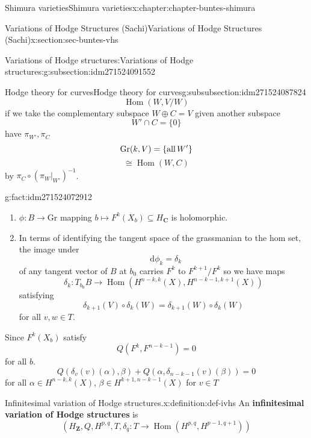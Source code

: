 \documentclass[oneside,10pt,]{book}
\newcommand{\terminology}[1]{\textbf{#1}}
\numberwithin{equation}{section}
\newcommand{\diff}{\mathop{}\!\mathrm{d}}
\newcommand{\inv}{^{-1}}
\newcommand{\ZZ}{\mathbf{Z}}
\newcommand{\CC}{\mathbf{C}}
\DeclareMathOperator{\Hom}{Hom}
\begin{document}
\begin{chapterptx}{Shimura varieties}{}{Shimura varieties}{}{}{x:chapter:chapter-buntes-shimura}
\begin{sectionptx}{Variations of Hodge Structures (Sachi)}{}{Variations of Hodge Structures (Sachi)}{}{}{x:section:sec-buntes-vhs}
\begin{subsectionptx}{Variations of Hodge structures:}{}{Variations of Hodge structures:}{}{}{g:subsection:idm271524091552}
\begin{subsubsectionptx}{Hodge theory for curves}{}{Hodge theory for curves}{}{}{g:subsubsection:idm271524087824}
\begin{equation*}
\Hom(W, V/W)
\end{equation*}
if we take the complementary subspace \(W  \oplus C = V\) given another subspace%
\begin{equation*}
W' \cap C =  \{ 0 \}
\end{equation*}
have \(\pi_{W'}, \pi_C\)%
\begin{equation*}
{\mathrm{Gr}}(k,V) = \{\text{all\,}W'\}
\end{equation*}
%
\begin{equation*}
\cong \Hom(W,C)
\end{equation*}
by \(\pi_C \circ (\pi_W|_{W'})\inv\).%
\begin{fact}{}{}{g:fact:idm271524072912}%
%
\begin{enumerate}
\item{}\(\phi\colon B\to {\mathrm{Gr}}\) mapping \(b \mapsto F^k(X_b) \subseteq H_\CC\) is holomorphic.%
\item{}In terms of identifying the tangent space of the grassmanian to the hom set, the image under%
\begin{equation*}
\diff \phi_k = \delta_k
\end{equation*}
of any tangent vector of \(B\) at \(b_0\) carries \(F^{k} \) to \(F^{k+1}/F^k\) so we have maps%
\begin{equation*}
\delta_k \colon T_{b_0} B \to \Hom(H^{n-k,k} (X), H^{n-k-1, k+1}(X))
\end{equation*}
satisfying%
\begin{equation*}
\delta_{k+1} (V) \circ \delta_k(W) =  \delta_{k+1}(W) \circ \delta_k(W)
\end{equation*}
for all \(v,w\in T\).%
\end{enumerate}
%
\end{fact}
Since \(F^k(X_b)\) satisfy%
\begin{equation*}
Q(F^k, F^{n- k - 1} ) = 0
\end{equation*}
for all \(b\).%
\begin{equation*}
Q(\delta_v(v)(\alpha), \beta) + Q(\alpha, \delta_{n-k-1}(v)(\beta)) = 0
\end{equation*}
for all \(\alpha\in H^{n-k, k}(X)\), \(\beta \in H^{k+1, n-k - 1}(X)\) for \(v \in T\)%
\begin{definition}{Infinitesimal variation of Hodge structures.}{x:definition:def-ivhs}%
An \terminology{infinitesimal variation of Hodge structures} is%
\begin{equation*}
(H_\ZZ, Q, H^{p,q}, T, \delta_q\colon T \to \Hom(H^{p,q}, H^{p-1, q+1}))

\end{equation*}
\end{definition}
\end{subsubsectionptx}
\end{subsectionptx}
\end{sectionptx}
\end{chapterptx}
\end{document}
